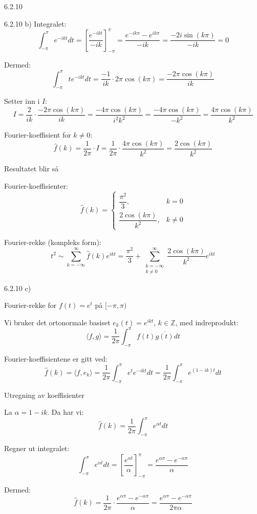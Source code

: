 \documentclass[a4paper,norsk]{article}
\begin{document}
\begin{oppgavebox}{6.2.10}{}
\begin{proofbox}{6.2.10 b)}{}
Integralet:
\[
\int_{-\pi}^{\pi} e^{-ikt}  dt = \left[ \frac{e^{-ikt}}{-ik} \right]_{-\pi}^{\pi} 
= \frac{e^{-ik\pi} - e^{ik\pi}}{-ik} = \frac{-2i\sin(k\pi)}{-ik} = 0
\]

Dermed:
\[
\int_{-\pi}^{\pi} t e^{-ikt}  dt = \frac{-1}{ik} \cdot 2\pi\cos(k\pi) = \frac{-2\pi\cos(k\pi)}{ik}
\]

Setter inn i $I$:
\[
I = \frac{2}{ik} \cdot \frac{-2\pi\cos(k\pi)}{ik} 
= \frac{-4\pi\cos(k\pi)}{i^2 k^2} 
= \frac{-4\pi\cos(k\pi)}{-k^2} 
= \frac{4\pi\cos(k\pi)}{k^2}
\]

Fourier-koeffisient for $k \neq 0$:
\[
\hat{f}(k) = \frac{1}{2\pi} \cdot I = \frac{1}{2\pi} \cdot \frac{4\pi\cos(k\pi)}{k^2} 
= \frac{2\cos(k\pi)}{k^2}
\]

Resultatet blir så

Fourier-koeffisienter:
\[
\hat{f}(k) = 
\begin{cases}
\dfrac{\pi^2}{3}, & k = 0 \\[1em]
\dfrac{2\cos(k\pi)}{k^2}, & k \neq 0
\end{cases}
\]

Fourier-rekke (kompleks form):
\[
t^2 \sim \sum_{k=-\infty}^{\infty} \hat{f}(k)e^{ikt} 
= \frac{\pi^2}{3} + \sum_{\substack{k=-\infty \\ k \neq 0}}^{\infty} \frac{2\cos(k\pi)}{k^2} e^{ikt}
\]
\end{proofbox}

\begin{proofbox}{6.2.10 c)}{}


Fourier-rekke for $f(t) = e^t$ på $[-\pi,\pi)$

Vi bruker det ortonormale basiset $e_k(t) = e^{ikt}$, $k \in \mathbb{Z}$, med indreprodukt:
\[
\langle f, g \rangle = \frac{1}{2\pi} \int_{-\pi}^{\pi} f(t) \overline{g(t)}  dt
\]

Fourier-koeffisientene er gitt ved:
\[
\hat{f}(k) = \langle f, e_k \rangle = \frac{1}{2\pi} \int_{-\pi}^{\pi} e^{t} e^{-ikt}  dt
= \frac{1}{2\pi} \int_{-\pi}^{\pi} e^{(1 - ik)t}  dt
\]

Utregning av koeffisienter

La $\alpha = 1 - ik$. Da har vi:
\[
\hat{f}(k) = \frac{1}{2\pi} \int_{-\pi}^{\pi} e^{\alpha t}  dt
\]

Regner ut integralet:
\[
\int_{-\pi}^{\pi} e^{\alpha t}  dt = \left[ \frac{e^{\alpha t}}{\alpha} \right]_{-\pi}^{\pi}
= \frac{e^{\alpha \pi} - e^{-\alpha \pi}}{\alpha}
\]

Dermed:
\[
\hat{f}(k) = \frac{1}{2\pi} \cdot \frac{e^{\alpha \pi} - e^{-\alpha \pi}}{\alpha}
= \frac{e^{\alpha \pi} - e^{-\alpha \pi}}{2\pi \alpha}
\]


\end{proofbox}
\end{oppgavebox}
\end{document}
